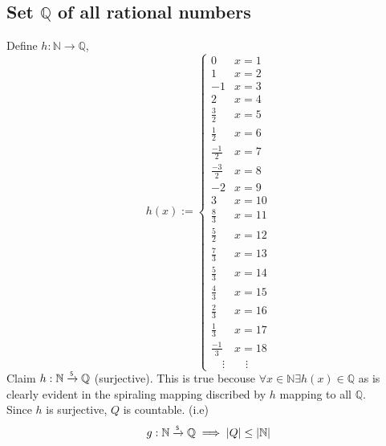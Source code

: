 \documentclass[]{article}
\newcommand{\N}{\mathbb{N}}
\newcommand{\Q}{\mathbb{Q}}
\newcommand{\toS}{\xrightarrow{\textsf{\tiny S}}}
\begin{document}
\subsection{Set $\Q$ of all rational numbers}
Define $h : \N \to \Q$,
\begin{displaymath}
	h(x) := 
	\begin{cases}
		0	& x = 1\\
		1	& x = 2\\
		-1	& x = 3\\
		2	& x = 4\\
		\frac{3}{2}	& x = 5\\
		\frac{1}{2} & x = 6\\
		\frac{-1}{2}& x = 7\\
		\frac{-3}{2}& x = 8\\
		-2	& x = 9\\
		3	& x = 10\\
		\frac{8}{3} & x = 11\\
		\frac{5}{2} & x = 12\\
		\frac{7}{3} & x = 13\\
		\frac{5}{3} & x = 14\\
		\frac{4}{3} & x = 15\\
		\frac{2}{3} & x = 16\\
		\frac{1}{3} & x = 17\\
		\frac{-1}{3} & x = 18\\
		\quad \vdots & \quad \vdots
	\end{cases}
\end{displaymath}
Claim $h : \N \toS \Q$ (surjective).
This is true becouse $\forall x \in \N \exists h(x) \in \Q$ as is 
clearly evident in the spiraling mapping discribed by $h$ mapping to all $\Q$.\\

Since $h$ is surjective, $Q$ is countable. (i.e)
$$g : \N \toS \Q \implies \abs{Q} \leq \abs{\N}$$

\newpage
\end{document}
